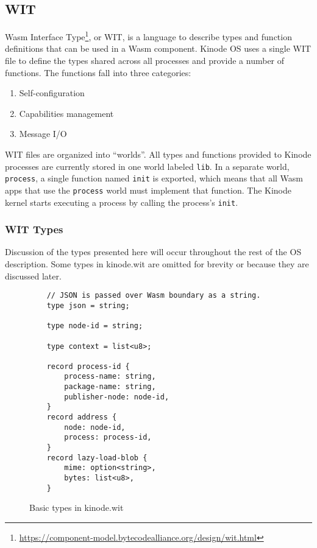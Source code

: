 \documentclass[runningheads]{llncs}
\begin{document}
\subsection{WIT}
\label{sec:oswit}

Wasm Interface Type\footnote{\url{https://component-model.bytecodealliance.org/design/wit.html}}, or WIT, is a language to describe types and function definitions that can be used in a Wasm component.
Kinode OS uses a single WIT file to define the types shared across all processes and provide a number of functions.
The functions fall into three categories:
\begin{enumerate}
    \item Self-configuration
    \item Capabilities management
    \item Message I/O
\end{enumerate}

WIT files are organized into ``worlds''.
All types and functions provided to Kinode processes are currently stored in one world labeled \verb|lib|.
In a separate world, \verb|process|, a single function named \verb|init| is exported, which means that all Wasm apps that use the \verb|process| world must implement that function.
The Kinode kernel starts executing a process by calling the process's \verb|init|.

\subsubsection{WIT Types}
\label{sec:oswittypes}

Discussion of the types presented here will occur throughout the rest of the OS description.
Some types in kinode.wit are omitted for brevity or because they are discussed later.

\begin{figure}[H]
    \centering
    \begin{verbatim}
    // JSON is passed over Wasm boundary as a string.
    type json = string;

    type node-id = string;

    type context = list<u8>;

    record process-id {
        process-name: string,
        package-name: string,
        publisher-node: node-id,
    }
    record address {
        node: node-id,
        process: process-id,
    }
    record lazy-load-blob {
        mime: option<string>,
        bytes: list<u8>,
    }
    \end{verbatim}
    \caption{Basic types in kinode.wit}
    \label{fig:WIT Types 1}
\end{figure}
\end{document}
